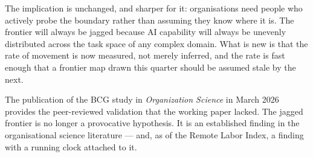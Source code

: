 The implication is unchanged, and sharper for it: organisations need people who actively probe the boundary rather than assuming they know where it is. The frontier will always be jagged because AI capability will always be unevenly distributed across the task space of any complex domain. What is new is that the rate of movement is now measured, not merely inferred, and the rate is fast enough that a frontier map drawn this quarter should be assumed stale by the next.

The publication of the BCG study in \emph{Organization Science} in March 2026 \parencite{DellAcqua2026} provides the peer-reviewed validation that the working paper lacked. The jagged frontier is no longer a provocative hypothesis. It is an established finding in the organisational science literature --- and, as of the Remote Labor Index, a finding with a running clock attached to it.
